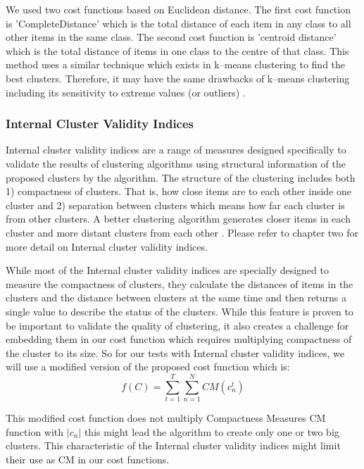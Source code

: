 We used two cost functions based on Euclidean distance. The first cost function is '\gls{CompleteDistance}' which is the total distance of each item in any class to all other items in the same class. The second cost function is 'centroid distance' which is the total distance of items in one class to the centre of that class. This method uses a similar technique which exists in k--means clustering to find the best clusters. Therefore, it may have the same drawbacks of k--means clustering including its sensitivity to extreme values (or outliers) \cite{Wu2002}.


\subsubsection{Internal Cluster Validity Indices}

Internal cluster validity indices are a range of measures designed specifically to validate the results of clustering algorithms using structural information of the proposed clusters by the algorithm. The structure of the clustering includes both 1) compactness of clusters. That is, how close items are to each other inside one cluster and 2) separation between clusters which means how far each cluster is from other clusters. A better clustering algorithm generates closer items in each cluster and more distant clusters from each other \cite{Liu2010}. Please refer to chapter two for more detail on Internal cluster validity indices.

While most of the Internal cluster validity indices are specially designed to measure the compactness of clusters, they calculate the distances of items in the clusters and the distance between clusters at the same time \cite{Zaki2014} and then returns a single value to describe the status of the clusters. While this feature is proven to be important to validate the quality of clustering, it also creates a challenge for embedding them in our cost function which requires multiplying compactness of the cluster to its size. So for our tests with Internal cluster validity indices, we will use a modified version of the proposed cost function which is:
\begin{equation}
f(C) = \sum_{t=1}^{T} \sum_{n=1}^{N} CM(c_{n}^{t}) 
\end{equation}

This modified cost function does not multiply Compactness Measures CM function with $\left | c_{n} \right |$ this might lead the algorithm to create only one or two big clusters. This characteristic of the Internal cluster validity indices might limit their use as CM in our cost functions.

